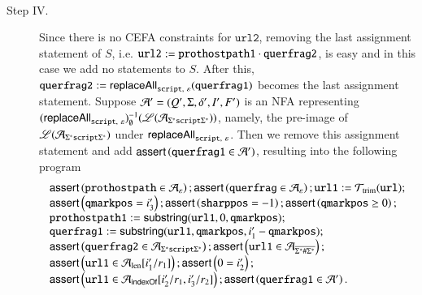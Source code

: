 \begin{example}
\begin{description}
\[\begin{array}{l}
\end{array}
\]
%
\item[Step IV.] Since there is no CEFA constraints for $\mathtt{url2}$, removing the last assignment statement of $S$, i.e. $\mathtt{url2} := \mathtt{prothostpath1} \cdot \mathtt{querfrag2}$, is easy and in this case we add no statements to $S$. After this, $\mathtt{querfrag2} := \mathsf{replaceAll}_{\mathtt{script},\ \varepsilon}(\mathtt{querfrag1})$ becomes the last assignment statement. Suppose $\mathcal{A}'=(Q', \Sigma, \delta', I', F')$ is an NFA representing $(\mathsf{replaceAll}_{\mathtt{script},\ \varepsilon})^{-1}_\emptyset(\mathscr{L}(\mathcal{A}_{\Sigma^*\mathtt{script}\Sigma^*}))$, namely, the pre-image of $\mathscr{L}(\mathcal{A}_{\Sigma^*\mathtt{script}\Sigma^*})$ under $\mathsf{replaceAll}_{\mathtt{script},\ \varepsilon}$. Then we remove this assignment statement and add $\textsf{assert}\left(\mathtt{querfrag1 \in \mathcal{A}'}\right)$, resulting into the following program
\[ 
\begin{array}{l}
    \textsf{assert}\left(\mathtt{prothostpath} \in \mathcal{A}_\varepsilon\right); \textsf{assert}\left(\mathtt{querfrag} \in \mathcal{A}_\varepsilon\right); \mathtt{url1} := \mathcal{T}_{\rm trim}(\mathtt{url}); \\
    \textsf{assert}\left(\mathtt{qmarkpos} = i'_3\right); \textsf{assert}\left(\mathtt{sharppos} =-1 \right); \textsf{assert}\left(\mathtt{qmarkpos} \ge 0\right); \\ 
    \mathtt{prothostpath1} := \mathsf{substring}(\mathtt{url1}, 0, \mathtt{qmarkpos});\\
   \mathtt{querfrag1} := \mathsf{substring}(\mathtt{url1, qmarkpos}, i'_1 - \mathtt{qmarkpos});\\
    \textsf{assert}\left(\mathtt{querfrag2} \in  \mathcal{A}_{\Sigma^*\mathtt{script}\Sigma^*}\right);  
    \textsf{assert}\left(\mathtt{url1} \in  \mathcal{A}_{\overline{\Sigma^*\#\Sigma^*}}\right); \\
    \textsf{assert}\left(\mathtt{url1} \in \mathcal{A}_{\rm len}[i'_1/r_1]\right);  \textsf{assert}\left(0= i'_2\right); \\
    \textsf{assert}\left(\mathtt{url1} \in \mathcal{A}_{\mathsf{indexOf}}[i'_2/r_1, i'_3/r_2]\right);  \textsf{assert}\left(\mathtt{querfrag1} \in \mathcal{A}'\right).
\end{array}
\]


\end{description}
\end{example}
